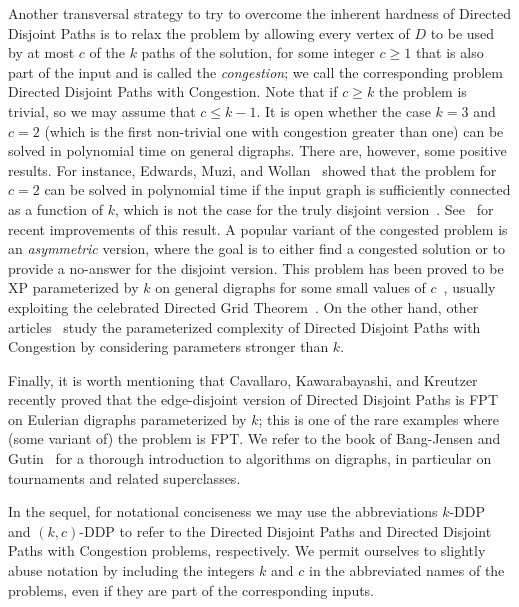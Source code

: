 \documentclass[a4paper,UKenglish,cleveref, autoref, thm-restate]{lipics-v2021}
\renewcommand{\FPT}{{\sf FPT}\xspace}
\renewcommand{\XP}{{\sf XP}\xspace}
\begin{document}
Another transversal strategy to try to overcome the inherent hardness of {\sc
Directed Disjoint Paths} is to relax the problem by allowing every vertex of $D$ to
be used by at most $c$ of the $k$ paths of the solution, for some integer $c \geq 1$
that is also part of the input and is called the \emph{congestion}; we call the
corresponding problem {\sc Directed Disjoint Paths with Congestion}. Note that if $c \geq k$ the problem is trivial, so we may
assume that $c \leq k -1$. It is open whether the case $k=3$ and $c=2$ (which is the
first non-trivial one with congestion greater than one) can be solved in polynomial
time on general digraphs. There are, however, some positive results. For instance,
Edwards, Muzi, and Wollan~\cite{Edwards2017} showed that the problem for $c=2$ can be
solved in polynomial time if the input graph is sufficiently connected as a function
of $k$, which is not the case for the truly disjoint version~\cite{Thomassen91}.
See~\cite{CamposC0S23} for recent improvements of this result. A popular variant of
the congested problem is an \emph{asymmetric} version, where the goal is to either
find a congested solution or to provide a {\sf no}-answer for the disjoint version.
This problem has been proved to be \XP parameterized by $k$ on general digraphs for
some small values of $c$~\cite{GiannopoulouKKK22,KawarabayashiKK14,KawarabayashiK15},
usually exploiting the celebrated Directed Grid
Theorem~\cite{Campos2022,KawarabayashiK15,HatzelKMM24}. On the other hand, other
articles~\cite{Amiri2019,Lopes2022} study the parameterized complexity of {\sc
Directed Disjoint Paths with Congestion} by considering parameters stronger than $k$.



Finally, it is worth mentioning that Cavallaro, Kawarabayashi, and
Kreutzer~\cite{CavallaroKK24} recently proved that the edge-disjoint version of {\sc
Directed Disjoint Paths} is \FPT on Eulerian digraphs parameterized by $k$; this is
one of the rare examples where (some variant of) the problem is \FPT. We refer to the
book of Bang-Jensen and Gutin~\cite{BangJensen2018} for a thorough introduction to
algorithms on digraphs, in particular on tournaments and related superclasses.

In the sequel, for notational conciseness we may use the abbreviations $k$-{\sc DDP}
and $(k,c)$-{\sc DDP} to refer to the {\sc Directed Disjoint Paths } and {\sc
Directed Disjoint Paths with Congestion} problems, respectively. We permit ourselves
to slightly abuse notation by including the integers $k$ and $c$ in the abbreviated
names of the problems, even if they are part of the corresponding  inputs.
\end{document}
